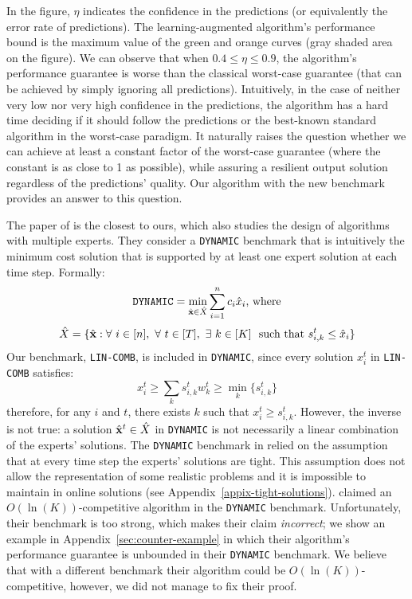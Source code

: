 \noindent In the figure, $\eta$ indicates the confidence in the predictions (or equivalently the error rate of predictions). The learning-augmented algorithm's performance bound is the maximum value of the green and orange curves (gray shaded area on the figure). We can observe that when $0.4 \leq \eta \leq 0.9$,
the algorithm's performance guarantee is worse than the classical worst-case guarantee (that can be achieved by simply ignoring all predictions).
Intuitively, in the case of neither very low nor very high confidence in the predictions, the algorithm has a hard time deciding if it should follow the predictions or the best-known standard algorithm in the worst-case paradigm.
It naturally raises the question whether we can achieve at least a constant factor of the worst-case guarantee (where the constant is as close to 1 as possible), while assuring a resilient output solution regardless of the predictions' quality.
Our algorithm with the new benchmark provides an answer to this question.


The paper of \cite{AnandGe22:Online-Algorithms} is the closest to ours, which also studies the design of algorithms with multiple experts.
They consider a \texttt{DYNAMIC} benchmark that is intuitively
the minimum cost solution that is supported by at least one expert solution at each time step. Formally:
\[\texttt{DYNAMIC} = \min_{\hat{\textbf{x}} \in \hat{X}} \sum_{i=1}^{n} c_i \hat{x}_i \textnormal{, where}\]
%
\[\hat{X} = \{\hat{\mathbf{x}} : \forall\ i \in [n],\ \forall\ t \in [T],\ \exists\ k \in [K]\ \textnormal{ such that } s_{i,k}^{t} \le \hat{x}_i \}\]
%
Our benchmark, \texttt{LIN-COMB}, is included in \texttt{DYNAMIC}, since every solution $x_{i}^{t}$ in \texttt{LIN-COMB} satisfies:
\[
	x_{i}^{t} \geq \sum_{k} s_{i,k}^{t}w_{k}^{t} \geq \min_{k} \{s_{i,k}^{t}\}
\]
therefore, for any $i$ and $t$, there exists $k$ such that $x_{i}^{t} \geq s_{i,k}^{t}$.
However, the inverse is not true: a solution $\hat{\mathbf{x}}^{t} \in \hat{X}$ in \texttt{DYNAMIC} is not necessarily
a linear combination of the experts' solutions.
The \texttt{DYNAMIC} benchmark in \cite{AnandGe22:Online-Algorithms} relied on the assumption that at every time step
the experts' solutions are tight. This assumption does not allow the representation of some realistic problems and it is impossible to maintain in online solutions (see Appendix~\ref{appix-tight-solutions}).
\cite{AnandGe22:Online-Algorithms} claimed an $O(\ln(K))$-competitive algorithm in the \texttt{DYNAMIC} benchmark.
Unfortunately, their benchmark is too strong, which makes their claim \emph{incorrect}; we show an example in Appendix~\ref{sec:counter-example}
in which their algorithm's performance guarantee is unbounded in their \texttt{DYNAMIC}
benchmark. We believe that with a different benchmark their algorithm could be $O(\ln(K))$-competitive, however, we did not manage to fix their proof.


